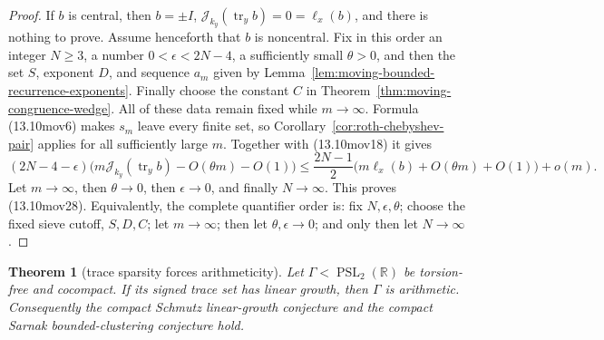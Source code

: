 \documentclass[11pt,reqno]{amsart}
\newtheorem{theorem}{Theorem}[section]
\theoremstyle{definition}
\theoremstyle{remark}
\newcommand{\R}{\mathbb R}
\newcommand{\Tr}{\operatorname{tr}}
\newcommand{\PSL}{\operatorname{PSL}}
\begin{document}
\begin{proof}
If \(b\) is central, then \(b=\pm I\),
\(\mathcal J_{k_y}(\Tr_yb)=0=\ell_x(b)\), and there is nothing to prove.
Assume henceforth that \(b\) is noncentral.
Fix in this order an integer \(N\ge3\), a number
\(0<\epsilon<2N-4\), a sufficiently small \(\theta>0\), and then the set
\(S\), exponent \(D\), and sequence \(a_m\) given by
Lemma~\ref{lem:moving-bounded-recurrence-exponents}.  Finally choose the
constant \(C\) in Theorem~\ref{thm:moving-congruence-wedge}.  All of these
data remain fixed while \(m\to\infty\).  Formula (13.10mov6) makes
\(s_m\) leave every finite set, so Corollary~\ref{cor:roth-chebyshev-pair}
applies for all sufficiently large \(m\).  Together with (13.10mov18) it
gives
\[
 (2N-4-\epsilon)
 \bigl(m\mathcal J_{k_y}(\Tr_yb)-O(\theta m)-O(1)\bigr)
 \le
 \frac{2N-1}{2}
 \bigl(m\ell_x(b)+O(\theta m)+O(1)\bigr)+o(m).
\tag{13.10mov29}
\]
Let \(m\to\infty\), then \(\theta\to0\), then
\(\epsilon\to0\), and finally \(N\to\infty\).  This proves
(13.10mov28).  Equivalently, the complete quantifier order is: fix
\(N,\epsilon,\theta\); choose the fixed sieve cutoff, \(S,D,C\); let
\(m\to\infty\); then let \(\theta,\epsilon\to0\); and only then let
\(N\to\infty\).
\end{proof}

\begin{theorem}[trace sparsity forces arithmeticity]
\label{thm:unconditional-compact-trace-sparsity}
Let \(\Gamma<\PSL_2(\R)\) be torsion-free and cocompact.  If its signed
trace set has linear growth, then \(\Gamma\) is arithmetic.  Consequently
the compact Schmutz linear-growth conjecture and the compact Sarnak
bounded-clustering conjecture hold.
\end{theorem}
\end{document}
